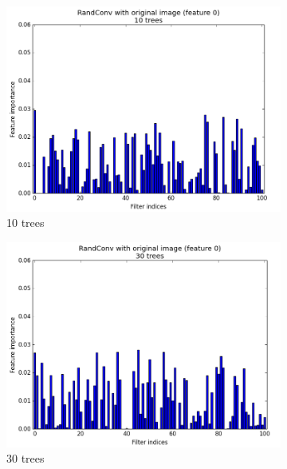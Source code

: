 \documentclass[a4paper]{report}
\begin{document}
		\begin{figure}
			\begin{subfigure}{.5\textwidth}
				\centering
				\includegraphics[width=1.\linewidth]{images/FI10trees.png}
				\caption{\label{fig:FI10trees}10 trees}
			\end{subfigure}%
			\begin{subfigure}{.5\textwidth}
				\centering
				\includegraphics[width=1.\linewidth]{images/FI30trees.png}
				\caption{\label{fig:FI30trees}30 trees}
			\end{subfigure}
			\begin{subfigure}{.5\textwidth}
				\centering

\end{subfigure}
\end{figure}
\end{document}
